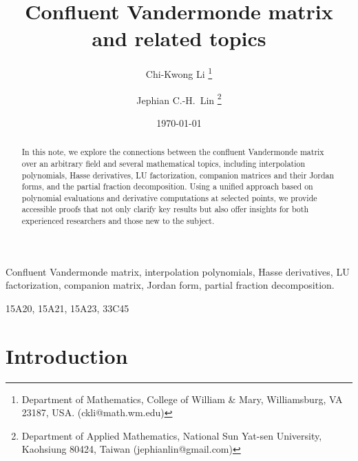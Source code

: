 \documentclass{article}
\title{Confluent Vandermonde matrix and related topics}
\author{
Chi-Kwong Li
\thanks{Department of Mathematics, College of William \& Mary, Williamsburg, VA 23187, USA. (ckli@math.wm.edu)}
\and
Jephian C.-H.~Lin
\thanks{Department of Applied Mathematics, National Sun Yat-sen University, Kaohsiung 80424, Taiwan (jephianlin@gmail.com)}
}
\date{\today}
\theoremstyle{definition}
\begin{document}
\maketitle


\begin{abstract}
In this note, we explore the connections between the confluent Vandermonde matrix over an arbitrary field and several mathematical topics, including 
interpolation polynomials, Hasse derivatives, LU factorization, companion matrices and their Jordan forms, and the partial fraction decomposition. Using a unified approach based on polynomial evaluations and derivative computations at selected points, we 
provide accessible proofs that not only clarify key results but also offer insights for both experienced researchers and those new 
to the subject.
\end{abstract}  

Confluent Vandermonde matrix, 
interpolation polynomials, Hasse derivatives, LU factorization, companion matrix, Jordan form,
partial fraction decomposition.

\medskip

15A20, %
15A21, %
15A23, %
33C45 %


\section{Introduction}
\end{document}

